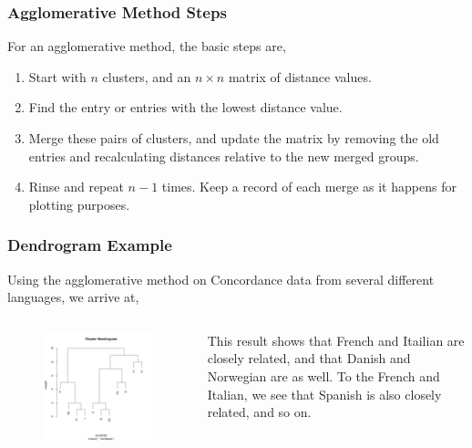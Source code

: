 \documentclass{beamer}
\begin{document}
\begin{frame}
\frametitle{Agglomerative Method Steps}
For an agglomerative method, the basic steps are,
\begin{enumerate}
\item Start with $n$ clusters, and an $n\times n$ matrix of distance values.
\pause
\item Find the entry or entries with the lowest distance value.
\pause
\item Merge these pairs of clusters, and update the matrix by removing the old entries and recalculating distances relative to the new merged groups.
\pause
\item Rinse and repeat $n-1$ times. Keep a record of each merge as it happens for plotting purposes.
\end{enumerate}
\end{frame}

\begin{frame}
\frametitle{Dendrogram Example}
Using the agglomerative method on Concordance data from several different languages, we arrive at,\\
\begin{columns}
\begin{figure}[ht]
\begin{center}
\includegraphics[scale=.45]{LanguageDendo.png}
\end{center}
\end{figure}
 This result shows that French and Itailian are closely related, and that Danish and Norwegian are as well. To the French and Italian, we see that Spanish is also closely related, and so on.
\end{columns}
\end{frame}
\end{document}
